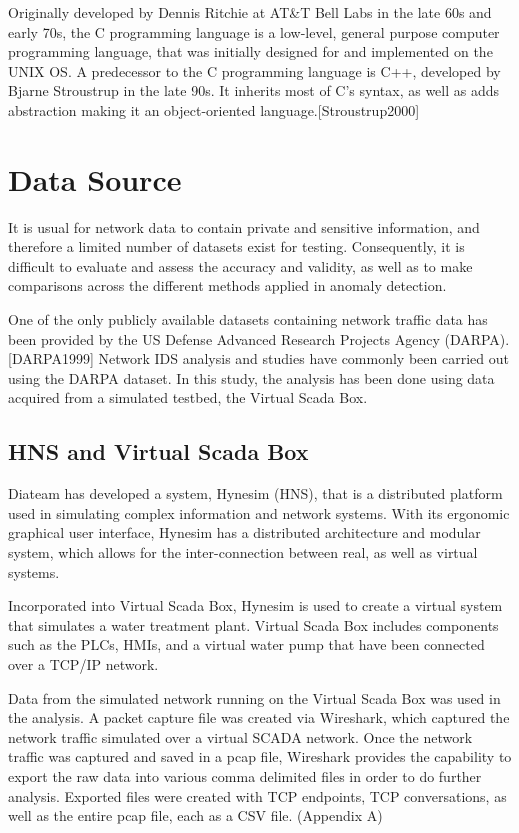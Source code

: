 \documentclass[12pt,]{article}
\begin{document}
Originally developed by Dennis Ritchie at AT\&T Bell Labs in the late
60s and early 70s, the C programming language is a low-level, general
purpose computer programming language, that was initially designed for
and implemented on the UNIX OS. A predecessor to the C programming
language is C++, developed by Bjarne Stroustrup in the late 90s. It
inherits most of C's syntax, as well as adds abstraction making it an
object-oriented language.{[}Stroustrup2000{]}

\pagebreak

\section{Data Source}\label{data-source}

It is usual for network data to contain private and sensitive
information, and therefore a limited number of datasets exist for
testing. Consequently, it is difficult to evaluate and assess the
accuracy and validity, as well as to make comparisons across the
different methods applied in anomaly detection.

One of the only publicly available datasets containing network traffic
data has been provided by the US Defense Advanced Research Projects
Agency (DARPA).{[}DARPA1999{]} Network IDS analysis and studies have
commonly been carried out using the DARPA dataset. In this study, the
analysis has been done using data acquired from a simulated testbed, the
Virtual Scada Box.

\subsection{HNS and Virtual Scada Box}\label{hns-and-virtual-scada-box}

Diateam has developed a system, Hynesim (HNS), that is a distributed
platform used in simulating complex information and network systems.
With its ergonomic graphical user interface, Hynesim has a distributed
architecture and modular system, which allows for the inter-connection
between real, as well as virtual systems.

Incorporated into Virtual Scada Box, Hynesim is used to create a virtual
system that simulates a water treatment plant. Virtual Scada Box
includes components such as the PLCs, HMIs, and a virtual water pump
that have been connected over a TCP/IP network.

Data from the simulated network running on the Virtual Scada Box was
used in the analysis. A packet capture file was created via Wireshark,
which captured the network traffic simulated over a virtual SCADA
network. Once the network traffic was captured and saved in a pcap file,
Wireshark provides the capability to export the raw data into various
comma delimited files in order to do further analysis. Exported files
were created with TCP endpoints, TCP conversations, as well as the
entire pcap file, each as a CSV file. (Appendix A)
\end{document}
